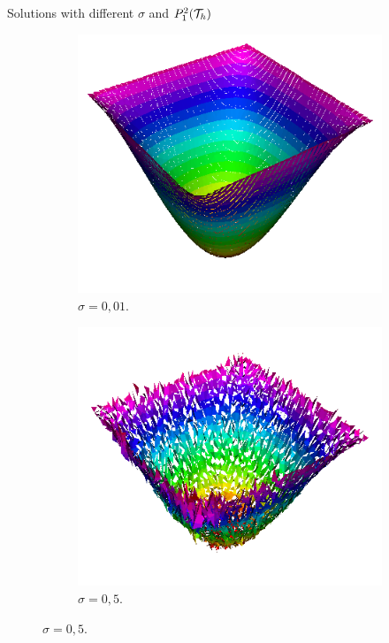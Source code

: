		\begin{frame}{Solutions with different $\sigma$ and $\relax{P}_1^2(\mathcal{T}_h)$}
		
		\begin{figure}[h!]
			\begin{subfigure}[b]{0.27\textwidth}
				\centering
				\includegraphics[scale=0.18]{img/Difusion/Recortes/steady_diffusion_approx_sigma_0_01.png}
				\caption{\scriptsize $\sigma=0,01$.}
			\end{subfigure}
			\begin{subfigure}[b]{0.27\textwidth}
				\centering
				\includegraphics[scale=0.18]{img/Difusion/Recortes/steady_diffusion_approx_sigma_0_5.png}
				\caption{\scriptsize $\sigma=0,5$.}
			\end{subfigure}

\end{figure}
\end{frame}
